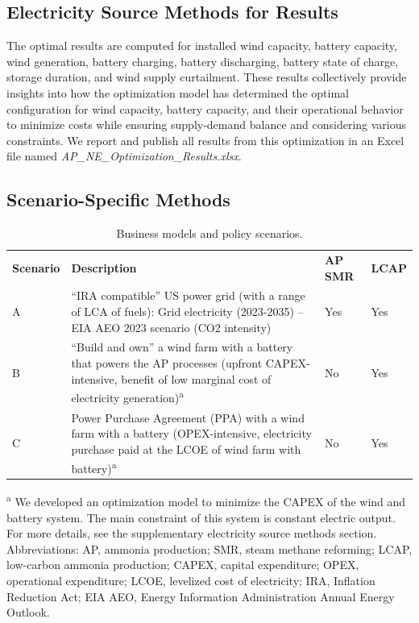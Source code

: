 \documentclass{article}
\begin{document}
\subsection{Electricity Source Methods for Results}

The optimal results are computed for installed wind capacity, battery capacity, wind generation, battery charging, battery discharging, battery state of charge, storage duration, and wind supply curtailment. These results collectively provide insights into how the optimization model has determined the optimal configuration for wind capacity, battery capacity, and their operational behavior to minimize costs while ensuring supply-demand balance and considering various constraints. We report and publish all results from this optimization in an Excel file named \textit{AP\_NE\_Optimization\_Results.xlsx}.

\subsection{Scenario-Specific Methods}

\begin{table}[H]
  \centering
  \caption{Business models and policy scenarios.}
  \label{tab:electricity-source-scenarios} %
  \begin{threeparttable}
    \begin{tabular}{@{}p{1.5cm}p{8cm}p{2cm}p{1.5cm}@{}}
    \toprule
    \textbf{Scenario} & \textbf{Description} & \textbf{AP SMR} & \textbf{LCAP} \\ 
    A & “IRA compatible” US power grid (with a range of LCA of fuels): Grid electricity (2023-2035) – EIA AEO 2023 scenario (CO2 intensity) & Yes & Yes \\ 
    B & “Build and own” a wind farm with a battery that powers the AP processes (upfront CAPEX-intensive, benefit of low marginal cost of electricity generation)\textsuperscript{a} & No & Yes \\ 
    C & Power Purchase Agreement (PPA) with a wind farm with a battery (OPEX-intensive, electricity purchase paid at the LCOE of wind farm with battery)\textsuperscript{a} & No & Yes \\ \bottomrule
    \end{tabular}
\begin{tablenotes}
  \footnotesize
  \item \textsuperscript{a} We developed an optimization model to minimize the CAPEX of the wind and battery system. The main constraint of this system is constant electric output. For more details, see the supplementary electricity source methods section. Abbreviations: AP, ammonia production; SMR, steam methane reforming; LCAP, low-carbon ammonia production; CAPEX, capital expenditure; OPEX, operational expenditure; LCOE, levelized cost of electricity; IRA, Inflation Reduction Act; EIA AEO, Energy Information Administration Annual Energy Outlook.
\end{tablenotes}

    
  \end{threeparttable}
\end{table}
\end{document}
